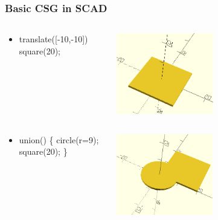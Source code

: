 \documentclass{beamer}
\begin{document}
\begin{frame}
\frametitle{Basic CSG in SCAD}
\begin{columns}
  \begin{column}{0.5\textwidth}
    \begin{itemize}
    \item translate([-10,-10]) square(20); 
    \end{itemize}
  \end{column}
  \begin{column}{0.5\textwidth}
    \includegraphics[width=0.5\textwidth, right]{openscad-translate_square_20.png}
  \end{column}
\end{columns}
\begin{columns}
  \begin{column}{0.5\textwidth}
    \begin{itemize}
    \item union() \{ circle(r=9); square(20); \}
    \end{itemize}
  \end{column}
  \begin{column}{0.5\textwidth}
    \includegraphics[width=0.5\textwidth, right]{openscad-union_circle_9_square_20.png}
  \end{column}
\end{columns}
\end{frame}
\end{document}
